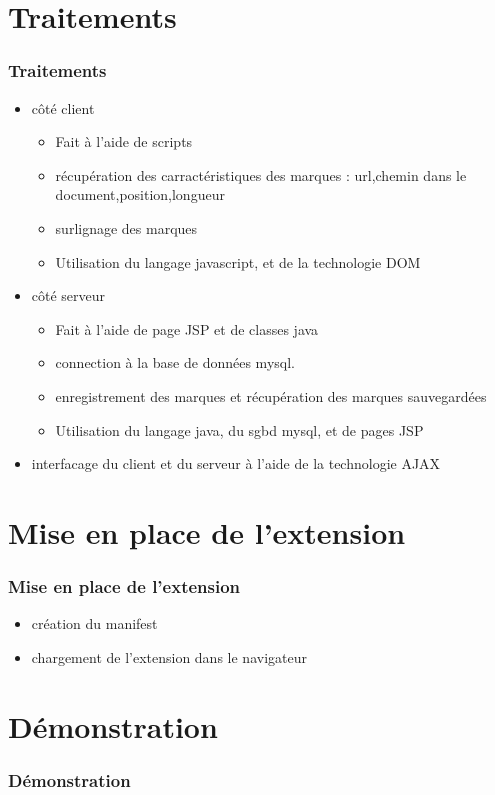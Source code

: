 \documentclass[9pt]{beamer}
\begin{document}
\section{Traitements}
\frame
{
	\frametitle{Traitements}
			\begin{itemize}
			\item côté client 
				\begin{itemize}
					\item Fait à l'aide de scripts 
					\item récupération des carractéristiques des marques : url,chemin dans le document,position,longueur
					\item surlignage des marques
					\item Utilisation du langage javascript, et de la technologie DOM
				\end{itemize}	
			\item côté serveur
				\begin{itemize}
					\item Fait à l'aide de page JSP et de classes java 
					\item connection à la base de données mysql.
					\item enregistrement des marques et récupération des marques sauvegardées
					\item Utilisation du langage java, du sgbd mysql, et de pages JSP
				\end{itemize}
			\item interfacage du client et du serveur à l'aide de la technologie AJAX
			\end{itemize}
}

\section{Mise en place de l'extension}
\frame
	{
		\frametitle{Mise en place de l'extension}
		\begin{itemize}
					\item création du manifest 
					\item chargement de l'extension dans le navigateur
		\end{itemize}
		
	}

\section{Démonstration}
\frame
{
	\frametitle{Démonstration}
	
}
\end{document}
